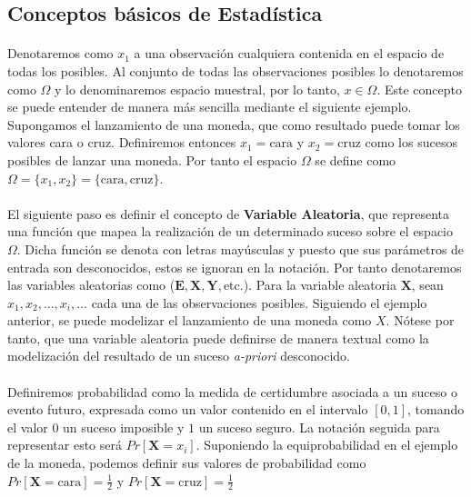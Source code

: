 \documentclass{subfiles}
\begin{document}
      \subsection{Conceptos básicos de Estadística}
      \label{sec:basic_statistics}

        \paragraph{}
        Denotaremos como $x_1$ a una observación cualquiera contenida en el espacio de todas los posibles. Al conjunto de todas las observaciones posibles lo denotaremos como $\Omega$ y lo denominaremos espacio muestral, por lo tanto, $x \in \Omega$. Este concepto se puede entender de manera más sencilla mediante el siguiente ejemplo. Supongamos el lanzamiento de una moneda, que como resultado puede tomar los valores cara o cruz. Definiremos entonces $x_1 = \text{cara}$ y $x_2 = \text{cruz}$ como los sucesos posibles de lanzar una moneda. Por tanto el espacio $\Omega$ se define como $\Omega = \{x_1, x_2\} = \{\text{cara}, \text{cruz}\}$.

        \paragraph{}
        El siguiente paso es definir el concepto de \textbf{Variable Aleatoria}, que representa una función que mapea la realización de un determinado suceso sobre el espacio $\Omega$. Dicha función se denota con letras mayúsculas y puesto que sus parámetros de entrada son desconocidos, estos se ignoran en la notación. Por tanto denotaremos las variables aleatorias como ($\boldsymbol{E}, \boldsymbol{X}, \boldsymbol{Y}, \text{etc.}$). Para la variable aleatoria $\boldsymbol{X}$, sean $x_1, x_2, ..., x_i,...$ cada una de las observaciones posibles. Siguiendo el ejemplo anterior, se puede modelizar el lanzamiento de una moneda como $X$. Nótese por tanto, que una variable aleatoria puede definirse de manera textual como la modelización del resultado de un suceso \emph{a-priori} desconocido.

        \paragraph{}
        Definiremos probabilidad como la medida de certidumbre asociada a un suceso o evento futuro, expresada como un valor contenido en el intervalo $[0,1]$, tomando el valor $0$ un suceso imposible y $1$ un suceso seguro. La notación seguida para representar esto será $Pr[\boldsymbol{X} = x_i]$. Suponiendo la equiprobabilidad en el ejemplo de la moneda, podemos definir sus valores de probabilidad como $Pr[\boldsymbol{X} = \text{cara}] = \tfrac{1}{2}$ y $Pr[\boldsymbol{X} = \text{cruz}] = \tfrac{1}{2}$
\end{document}
